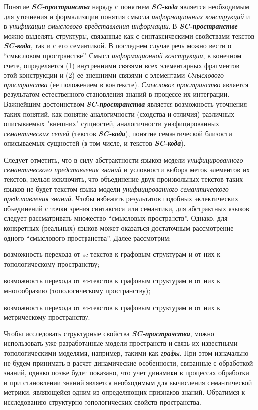 Понятие \textbf{\textit{SC-пространства}} наряду с понятием \textbf{\textit{SC-кода}} является необходимым для уточнения и формализации понятия смысла \textit{информационных конструкций} и в \textit{унификации смыслового представления информации}. В \textbf{\textit{SC-пространстве}} можно выделять структуры, связанные как с синтаксическими свойствами текстов \textbf{\textit{SC-кода}}, так и с его семантикой. В последнем случае речь можно вести о ``смысловом пространстве''. Смысл \textit{информационной конструкции}, в конечном счете, определяется (1) внутренними связями всех элементарных фрагментов этой конструкции и (2) ее внешними связями с элементами \textit{Cмыслового пространства} (ее положением в контексте). \textit{Смысловое пространство} является результатом естественного становления знаний в процессе их интеграции.
Важнейшим достоинством \textbf{\textit{SC-пространства}} является возможность уточнения таких понятий, как понятие аналогичности (сходства и отличия) различных описываемых "внешних"{} сущностей, аналогичности унифицированных \textit{семантических сетей} (текстов \textbf{\textit{SC-кода}}), понятие семантической близости описываемых сущностей (в том числе, и текстов \textbf{\textit{SC-кода}}).

Следует отметить, что в силу абстрактности языков модели \textit{унифицированного семантического представления знаний} и условности выбора меток элементов их текстов, нельзя исключить, что объединение двух произвольных текстов таких языков не будет текстом языка модели \textit{унифицированного семантического представления знаний}. Чтобы избежать результатов подобных эклектических объединений с точки зрения синтаксиса или семантики, для абстрактных языков следует рассматривать множество ``смысловых пространств''. Однако, для конкретных (реальных) языков может оказаться достаточным рассмотрение одного ``смыслового пространства''.
Далее рассмотрим:

\begin{textitemize}
	\item возможность перехода от sc-текстов к графовым структурам и от них к топологическому пространству;
	\item возможность перехода от sc-текстов к графовым структурам и от них к многообразию (топологическому пространству);
	\item возможность перехода от sc-текстов к графовым структурам и от них к метрическому пространству.
\end{textitemize}

Чтобы исследовать структурные свойства \textbf{\textit{SC-пространства}}, можно использовать уже разработанные модели пространств и связь их известными топологическими моделями, например, такими как \textit{графы}. При этом изначально не будем принимать в расчет динамические особенности, связанные с обработкой знаний, однако позже будет показано, что учет динамики в процессах обработки и при становлении знаний является необходимым для вычисления семантической метрики, являющейся одним из определяющих признаков знаний.
Обратимся к исследованию структурно-топологических свойств пространства.

